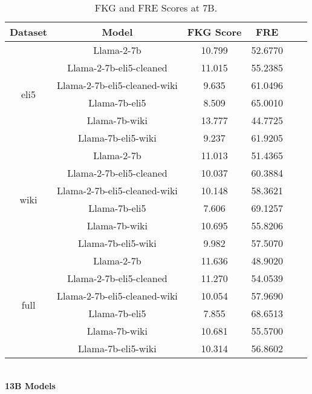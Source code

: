 \documentclass[11pt, oneside]{article}   	%
\begin{document}
\begin{table}
\centering
\begin{tabular}{cccccc}
\hline
Dataset & Model &FKG Score & FRE \\
\hline
\multirow{6}{*}{eli5} & Llama-2-7b & 10.799 & 52.6770 \\
 & Llama-2-7b-eli5-cleaned & 11.015 & 55.2385 \\
 & Llama-2-7b-eli5-cleaned-wiki & 9.635 & 61.0496 \\
 & Llama-7b-eli5 & 8.509 & 65.0010 \\
 & Llama-7b-wiki & 13.777 & 44.7725 \\
 & Llama-7b-eli5-wiki & 9.237 & 61.9205 \\
\hline
\multirow{6}{*}{wiki} & Llama-2-7b & 11.013 & 51.4365 \\
 & Llama-2-7b-eli5-cleaned & 10.037 & 60.3884 \\
 & Llama-2-7b-eli5-cleaned-wiki & 10.148 & 58.3621 \\
 & Llama-7b-eli5 & 7.606 & 69.1257 \\
 & Llama-7b-wiki & 10.695 & 55.8206 \\
 & Llama-7b-eli5-wiki & 9.982 & 57.5070 \\
\hline
\multirow{6}{*}{full} & Llama-2-7b & 11.636 & 48.9020 \\
 & Llama-2-7b-eli5-cleaned & 11.270 & 54.0539 \\
 & Llama-2-7b-eli5-cleaned-wiki & 10.054 & 57.9690 \\
 & Llama-7b-eli5 & 7.855 & 68.6513 \\
 & Llama-7b-wiki & 10.681 & 55.5700 \\
 & Llama-7b-eli5-wiki & 10.314 & 56.8602 \\
\hline
\end{tabular}
\caption{FKG and FRE Scores at 7B.}
\label{tab:scores}
\end{table}
\
\\[10pt]
\noindent\textbf{13B Models}
\\[10pt]

\end{document}
